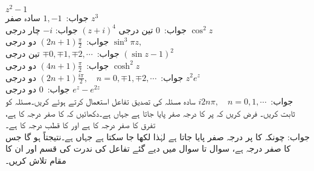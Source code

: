 \quad
$z^2-1$\\
جواب:\quad
$1,-1\,$
سادہ صفر
\quad
$z^3\,$\\
جواب:\quad
$0\,$
تین درجی
\quad
$(z+i)^4$
جواب:\quad
$-i$
چار درجی
\quad
$\cos^2 z\,$\\
جواب:\quad
$(2n+1)\tfrac{\pi}{2}\,$
دو درجی
\quad
$\sin^3 \pi z,$\\
جواب:\quad
$\mp 0, \mp 1,\mp 2,\cdots \,$
تین درجی
\quad
$(\sin z-1)^2\,$\\
جواب:\quad
$(4n+1)\tfrac{\pi}{2}\,$
دو درجی
\quad
$\cosh^2 z\,$\\
جواب:\quad
$(2n+1)\tfrac{i\pi}{2},\quad n=0,\mp1,\mp2,\cdots\,$
دو درجی
\quad
$z^2e^z\,$\\
جواب:\quad
$0\,$
دو درجی
\quad
$e^z-e^{2z}\,$\\
جواب:\quad
$i2n\pi,\quad n=0,1,\cdots\,$
سادہ
\quad
مسئلہ  کی تصدیق تفاعل  استعمال کرتے ہوئے کریں۔مسئلہ  کو ثابت کریں۔
\quad
فرض کریں کہ  پر  کا درجہ  صفر پایا جاتا ہے جہاں  ہے۔دکھائیں کہ  کا صفر درجہ  کا ہے، تفرق  کا صفر درجہ  کا ہے اور  کا قطب درجہ  کا ہے۔\\
جواب:\quad
چونکہ  کا  پر درجہ  صفر پایا جاتا ہے لہٰذا   لکھا جا سکتا ہے جہاں  ہے۔نتیجتاً
  ہو گا جس کا صفر درجہ  ہے،  
سوال  تا سوال  میں دیے گئے تفاعل کی ندرت کی قسم اور ان کا مقام تلاش کریں۔

